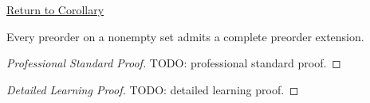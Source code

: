 \newpage
{}
\label{prf:complete-preorder-extension}

\begin{remark*}[Return]
\hyperref[cor:complete-preorder-extension]{Return to Corollary}
\end{remark*}

\begin{corollary*}
Every preorder on a nonempty set admits a complete preorder extension.
\end{corollary*}

\begin{proof}[Professional Standard Proof]
\LRAProofBodyStart
TODO: professional standard proof.
\end{proof}

\begin{proof}[Detailed Learning Proof]
\LRAProofBodyStart
TODO: detailed learning proof.
\end{proof}

\begin{remark*}
\end{remark*}

\NoLocalDependencies

\clearpage

